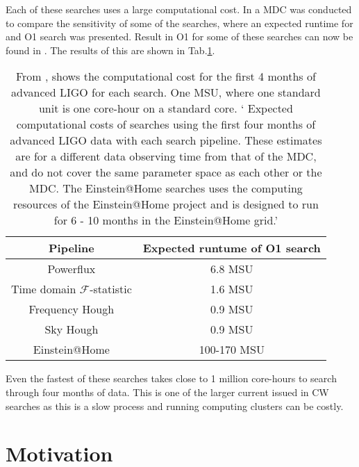 Each of these searches uses a large computational cost. In \citep{walsh2016ComparisonMethods} a \gls{MDC} was conducted to compare the sensitivity of some of the searches, where an expected runtime for and O1 search was presented. Result in O1 for some of these searches can now be found in \citep{ligoscientificcollaborationandvirgocollaboration2017AllskySearch}.
The results of this are shown in Tab.\ref{searchcw:search:semi:cost}.
\begin{table}
	\centering
	\caption[Computational cost of \gls{CW} searches.]{From \citep{walsh2016ComparisonMethods}, shows the computational cost for the first 4 months of advanced \gls{LIGO} for each search. One \gls{MSU}, where one standard unit is one core-hour on a standard core. ` Expected computational costs of searches using the first four months of advanced \gls{LIGO} data with each search pipeline. These estimates are for a different data observing time from that of the \gls{MDC}, and do not cover the same parameter space as each other or the \gls{MDC}. The Einstein@Home searches uses the computing resources of the Einstein@Home project and is designed to run for 6 - 10 months in the Einstein@Home grid.'  \label{searchcw:search:semi:cost}}
	
	\bgroup
	\def\arraystretch{1.5}
	\centering
	\begin{tabular}{|c c|}
		\hline
		Pipeline & Expected runtume of O1 search \\
		\hline
		Powerflux & 6.8 MSU \\

		Time domain $\mathcal{F}$-statistic & 1.6 MSU\\

		Frequency Hough & 0.9 MSU \\

		Sky Hough & 0.9 MSU\\
		\hline
		Einstein@Home & 100-170 MSU\\
		\hline

	\end{tabular}
	\egroup
\end{table}
Even the fastest of these searches takes close to 1 million core-hours to search through four months of data.
This is one of the larger current issued in \gls{CW} searches as this is a slow process and running computing clusters can be costly.


\section{\label{searchcw:motivation}Motivation}

